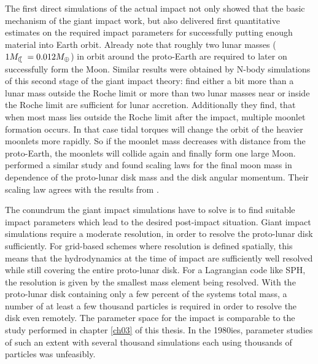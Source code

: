 The first direct simulations \citep{Benz:1985p1755, Benz:1989p1893, Cameron:2000p1854} of the actual impact not only showed that the basic mechanism of the giant impact work, but also delivered first quantitative estimates on the required impact parameters for successfully putting enough material into Earth orbit. Already \cite{1975Icar...24..504H} note that roughly two lunar masses ($1 \ML = 0.012 \ME$) in orbit around the proto-Earth are required to later on successfully form the Moon. Similar results were obtained by N-body simulations of this second stage of the giant impact theory: \cite{Canup:1996p3541} find either a bit more than a lunar mass outside the Roche limit or more than two lunar masses near or inside the Roche limit are sufficient for lunar accretion. Additionally they find, that when most mass lies outside the Roche limit after the impact, multiple moonlet formation occurs. In that case tidal torques will change the orbit of the heavier moonlets more rapidly. So if the moonlet mass decreases with distance from the proto-Earth, the moonlets will collide again and finally form one large Moon. \citep{Ida:1997p3395} performed a similar study and found scaling laws for the final moon mass in dependence of the proto-lunar disk mass and the disk angular momentum. Their scaling law agrees with the results from \cite{Canup:1996p3541}.

The conundrum the giant impact simulations have to solve is to find suitable impact parameters which lead to the desired post-impact situation. Giant impact simulations require a moderate resolution, in order to resolve the proto-lunar disk sufficiently. For grid-based schemes where resolution is defined spatially, this means that the hydrodynamics at the time of impact are sufficiently well resolved while still covering the entire proto-lunar disk. For a Lagrangian code like SPH, the resolution is given by the smallest mass element being resolved. With the proto-lunar disk containing only a few percent of the systems total mass, a number of at least a few thousand particles is required in order to resolve the disk even remotely. The parameter space for the impact is comparable to the study performed in chapter \ref{ch03} of this thesis. In the 1980ies, parameter studies of such an extent with several thousand simulations each using thousands of particles was unfeasibly.

